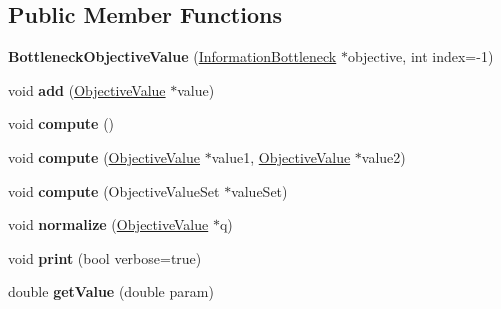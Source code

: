\subsection*{Public Member Functions}
\begin{DoxyCompactItemize}
\item 
\hypertarget{classBottleneckObjectiveValue_a472c19dd35594975cdc8d63b06bec066}{{\bfseries Bottleneck\-Objective\-Value} (\hyperlink{classInformationBottleneck}{Information\-Bottleneck} $\ast$objective, int index=-\/1)}\label{classBottleneckObjectiveValue_a472c19dd35594975cdc8d63b06bec066}

\item 
\hypertarget{classBottleneckObjectiveValue_acca02ede3d42cbb71852339087bdff22}{void {\bfseries add} (\hyperlink{classObjectiveValue}{Objective\-Value} $\ast$value)}\label{classBottleneckObjectiveValue_acca02ede3d42cbb71852339087bdff22}

\item 
\hypertarget{classBottleneckObjectiveValue_a2a1bfd06ae2ae78f7e347703f1805984}{void {\bfseries compute} ()}\label{classBottleneckObjectiveValue_a2a1bfd06ae2ae78f7e347703f1805984}

\item 
\hypertarget{classBottleneckObjectiveValue_ac6672e91013a5667488e7fccbc452fed}{void {\bfseries compute} (\hyperlink{classObjectiveValue}{Objective\-Value} $\ast$value1, \hyperlink{classObjectiveValue}{Objective\-Value} $\ast$value2)}\label{classBottleneckObjectiveValue_ac6672e91013a5667488e7fccbc452fed}

\item 
\hypertarget{classBottleneckObjectiveValue_ae6edb61731a33a8c3c28c9de3f011fa9}{void {\bfseries compute} (Objective\-Value\-Set $\ast$value\-Set)}\label{classBottleneckObjectiveValue_ae6edb61731a33a8c3c28c9de3f011fa9}

\item 
\hypertarget{classBottleneckObjectiveValue_a20cd5a3dce433043a3ce9641fc6df8b3}{void {\bfseries normalize} (\hyperlink{classObjectiveValue}{Objective\-Value} $\ast$q)}\label{classBottleneckObjectiveValue_a20cd5a3dce433043a3ce9641fc6df8b3}

\item 
\hypertarget{classBottleneckObjectiveValue_a5dd538d1531ca10fc8b1261ee83be8f2}{void {\bfseries print} (bool verbose=true)}\label{classBottleneckObjectiveValue_a5dd538d1531ca10fc8b1261ee83be8f2}

\item 
\hypertarget{classBottleneckObjectiveValue_a76d0963588415208aca8da0d1f1b4600}{double {\bfseries get\-Value} (double param)}\label{classBottleneckObjectiveValue_a76d0963588415208aca8da0d1f1b4600}

\end{DoxyCompactItemize}
